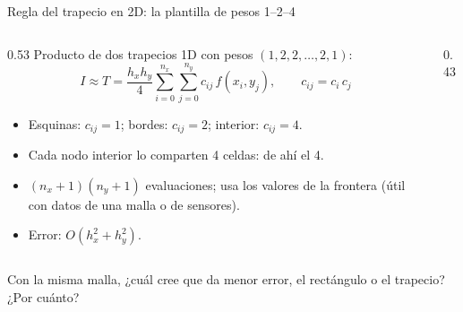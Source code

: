 \documentclass[aspectratio=169,10pt]{beamer}
\begin{document}
\begin{frame}{Regla del trapecio en 2D: la plantilla de pesos 1--2--4}
\begin{columns}[T]
\begin{column}{0.53\textwidth}
\small
Producto de dos trapecios 1D con pesos $(1,2,2,\dots,2,1)$:
\[
I\approx T=\frac{h_xh_y}{4}\sum_{i=0}^{n_x}\sum_{j=0}^{n_y} c_{ij}\,f(x_i,y_j),\qquad c_{ij}=c_i\,c_j
\]
\begin{itemize}
\item Esquinas: $c_{ij}=1$; bordes: $c_{ij}=2$; interior: $c_{ij}=4$.
\item Cada nodo interior lo comparten 4 celdas: de ah\'i el 4.
\item $(n_x+1)(n_y+1)$ evaluaciones; usa los valores de la frontera (\'util con datos de una malla o de sensores).
\item Error: $O(h_x^2+h_y^2)$.
\end{itemize}
\end{column}
\begin{column}{0.43\textwidth}
\centering
{}
\end{column}
\end{columns}
\begin{pregunta}
Con la misma malla, ¿cu\'al cree que da menor error, el rect\'angulo o el trapecio? ¿Por cu\'anto?
\end{pregunta}
\end{frame}
\end{document}
